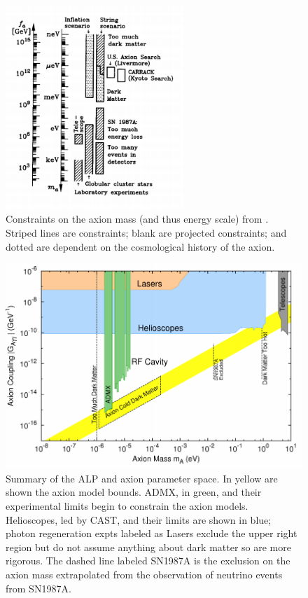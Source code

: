 \documentclass[12pt,twosides]{book}
\begin{document}
\begin{figure}
\centering
\includegraphics[width=0.6\textwidth]{1dexclusionlimit}
\caption{Constraints on the axion mass (and thus energy scale) from \cite{raffelt80}. Striped lines are constraints; blank are projected constraints; and dotted are dependent on the cosmological history of the axion.}
\end{figure}

\begin{figure}
\centering
\includegraphics[width=\textwidth]{2dexclusionplot}
\caption{Summary of the ALP and axion parameter space. In yellow are shown the axion model bounds. ADMX, in green, and their experimental limits begin to constrain the axion models. Helioscopes, led by CAST, and their limits are shown in blue; photon regeneration expts labeled as Lasers exclude the upper right region but do not assume anything about dark matter so are more rigorous. The dashed line labeled SN1987A is the exclusion on the axion mass extrapolated from the observation of neutrino events from SN1987A.}
\end{figure}
\end{document}
